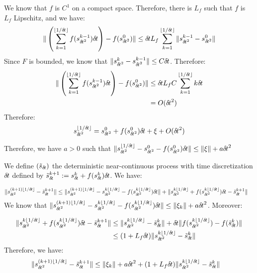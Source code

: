   We know that $f$ is $C^1$ on a compact space. Therefore, there is $L_f$ such that $f$ is $L_f$ Lipschitz, and we have:
  \begin{align}
    \|\left(\sum_{k=1}^{\lfloor 1/\deltat\rfloor} f(s_{\deltat^2}^{k-1})\deltat\right) - f(s_{\deltat^2}^0) \| \leq \deltat L_f\sum_{k=1}^{\lfloor 1/\deltat\rfloor} \|s_{\deltat^2}^{k-1} - s_{\deltat^2}^0\|
  \end{align}
  Since $F$ is bounded, we know that $\|s_{\deltat^2}^{k} - s_{\deltat^2}^{k-1}\| \leq C\deltat$. Therefore:
  \begin{align}
    \|\left(\sum_{k=1}^{\lfloor 1/\deltat\rfloor} f(s_{\deltat^2}^{k-1})\deltat\right) - f(s_{\deltat^2}^0) \| &\leq \deltat L_fC\sum_{k=1}^{\lfloor 1/\deltat\rfloor} k\deltat \\
    &= \bigO(\deltat^2) 
  \end{align}
  Therefore: 
  \begin{align}
  s_{\deltat^2}^{\lfloor 1/\deltat \rfloor} =  s_{\deltat^2}^0 + f(s_{\deltat^2}^0) \deltat + \xi + \bigO(\deltat^2) 
  \end{align}

  Therefore, we have $a>0$ such that $\|s_{\deltat^2}^{\lfloor 1/\deltat \rfloor} -  s_{\deltat^2}^0 - f(s_{\deltat^2}^0) \deltat\| \leq \|\xi\| + a\deltat^2$
  
We define $(\tilde s_\deltat)$ the deterministic near-continuous process with time discretization $\deltat$ defined by $\tilde s_\deltat^{k+1} \deq s_\deltat^k + f(s_\deltat^k)\deltat$. We have:

\begin{align}
  \|s_{\deltat^2}^{(k+1)\lfloor 1/\deltat\rfloor}  - \tilde{s}_\deltat^{k+1}\| &\leq \|s_{\deltat^2}^{(k+1)\lfloor 1/\deltat\rfloor} - s_{\deltat^2}^{k\lfloor 1/\deltat\rfloor} - f(s_{\deltat^2}^{k\lfloor 1/\deltat\rfloor})\deltat\| + \|s_{\deltat^2}^{k\lfloor 1/\deltat\rfloor} + f(s_{\deltat^2}^{k\lfloor 1/\deltat\rfloor})\deltat - \tilde{s}_\deltat^{k+1}\|
\end{align}
We know that $\|s_{\deltat^2}^{(k+1)\lfloor 1/\deltat\rfloor} - s_{\deltat^2}^{k\lfloor 1/\deltat\rfloor} - f(s_{\deltat^2}^{k\lfloor 1/\deltat\rfloor})\deltat\| \leq \|\xi_k\| + a\deltat^2$. Moreover:

\begin{align}
  \|s_{\deltat^2}^{k\lfloor 1/\deltat\rfloor} + f(s_{\deltat^2}^{k\lfloor 1/\deltat\rfloor})\deltat - \tilde{s}_\deltat^{k+1}\| &\leq \|s_{\deltat^2}^{k\lfloor 1/\deltat\rfloor} - \tilde{s}_\deltat^{k} \| + \deltat\|f(s_{\deltat^2}^{k\lfloor 1/\deltat\rfloor}) - f(\tilde{s}_\deltat^{k})\| \\
  &\leq (1+L_f\deltat)\|s_{\deltat^2}^{k\lfloor 1/\deltat\rfloor} - \tilde{s}_\deltat^{k} \| 
\end{align}
Therefore, we have:
\begin{align}
 \|s_{\deltat^2}^{(k+1)\lfloor 1/\deltat\rfloor}  - \tilde{s}_\deltat^{k+1}\| &\leq \|\xi_k\| + a\deltat^2 + (1+L_f\deltat)\|s_{\deltat^2}^{k\lfloor 1/\deltat\rfloor}  - \tilde{s}_\deltat^{k}\|  
\end{align}

